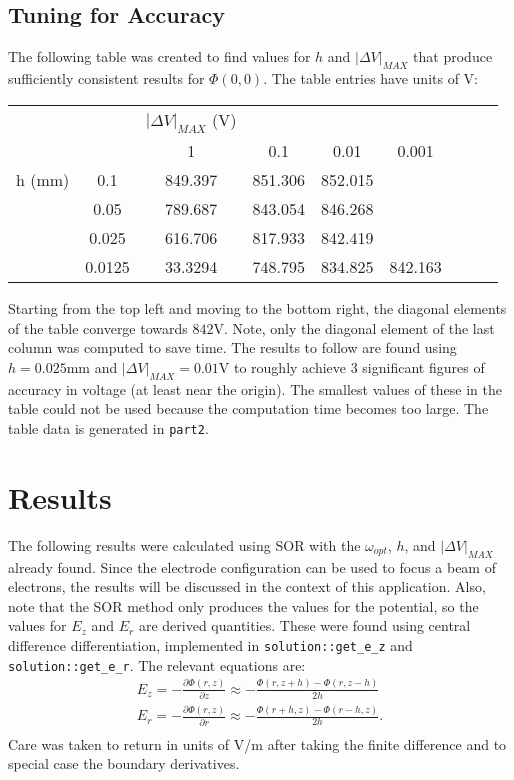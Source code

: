 \documentclass[12pt]{article}
\begin{document}
\subsection{Tuning for Accuracy}
The following table was created to find values for $h$ and $|\Delta V|_{MAX}$ that produce sufficiently consistent results for $\Phi(0, 0)$. The table entries have units of V:
\begin{center}
\begin{tabular}{ c c | c c c c c c c }
&& $|\Delta V|_{MAX}$ (V) \\
& &   1    &   0.1   &    0.01    &    0.001 \\ \hline
h (mm)    &   0.1    & 849.397 & 851.306 & 852.015    &\\
          &   0.05   & 789.687 & 843.054 & 846.268    &\\
          &   0.025  & 616.706 & 817.933 & 842.419    &\\
          &   0.0125 & 33.3294 & 748.795 & 834.825    & 842.163\\
\end{tabular}
\end{center}
Starting from the top left and moving to the bottom right, the diagonal elements of the table converge towards $842$V. Note, only the diagonal element of the last column was computed to save time. The results to follow are found using $h = 0.025$mm and $|\Delta V|_{MAX} = 0.01$V to roughly achieve 3 significant figures of accuracy in voltage (at least near the origin). The smallest values of these in the table could not be used because the computation time becomes too large. The table data is generated in \texttt{part2}.
\section{Results}
The following results were calculated using SOR with the $\omega_{opt}$, $h$, and $|\Delta V|_{MAX}$ already found. Since the electrode configuration can be used to focus a beam of electrons, the results will be discussed in the context of this application. Also, note that the SOR method only produces the values for the potential, so the values for $E_z$ and $E_r$ are derived quantities. These were found using central difference differentiation, implemented in \texttt{solution::get\_e\_z} and \texttt{solution::get\_e\_r}. The relevant equations are:
\begin{align*}
E_z = -\frac{\partial \Phi(r, z)}{\partial z}
    \approx -\frac{\Phi(r, z + h) - \Phi(r, z - h)}{2h} \\
E_r = -\frac{\partial \Phi(r, z)}{\partial r}
    \approx -\frac{\Phi(r + h, z) - \Phi(r - h, z)}{2h}. \\
\end{align*}
Care was taken to return in units of V/m after taking the finite difference and to special case the boundary derivatives.
\end{document}
